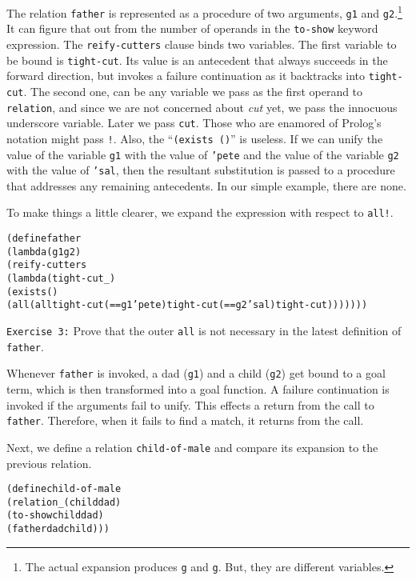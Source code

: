 The relation \texttt{father} is represented as a procedure of two
arguments, \texttt{g1} and \texttt{g2}.\footnote{The actual expansion
produces \texttt{g} and \texttt{g}.  But, they are different
variables.} It can figure that out from the number of operands in
the \texttt{to-show} keyword expression. The \texttt{reify-cutters}
clause binds two variables.  The first variable to be bound is
\texttt{tight-cut}.  Its value is an antecedent that always succeeds in the
forward direction, but invokes a failure continuation as it backtracks
into \texttt{tight-cut}.  The second one, can be any variable we pass as
the first operand to \texttt{relation}, and since we are not concerned
about \emph{cut} yet, we pass the innocuous underscore variable.
Later we pass \texttt{cut}.  Those who are enamored of Prolog's
notation might pass \texttt{!}.  Also, the ``\texttt{(exists ()}'' is
useless.  If we can unify the value of the variable \texttt{g1} with
the value of \texttt{'pete} and the value of the variable \texttt{g2}
with the value of \texttt{'sal}, then the resultant substitution is
passed to a procedure that addresses any remaining antecedents.  In
our simple example, there are none.

To make things a little clearer, we expand the expression with respect
to \texttt{all!}.

\begin{alltt}
(define father
  (lambda (g1 g2)
    (reify-cutters
      (lambda (tight-cut _)
        (exists ()
          (all (all tight-cut (== g1 'pete) tight-cut (== g2 'sal) tight-cut)))))))
\end{alltt}

\texttt{Exercise 3:} Prove that the outer \texttt{all} is not
necessary in the latest definition of \texttt{father}.

Whenever \texttt{father} is invoked, a dad (\texttt{g1}) and a child
(\texttt{g2}) get bound to a goal term, which is then transformed into
a goal function.  A failure continuation is invoked if the arguments
fail to unify.  This effects a return from the call to
\texttt{father}.  Therefore, when it fails to find a match, it returns
from the call.

Next, we define a relation \texttt{child-of-male} and compare its expansion
to the previous relation.

\begin{alltt}
(define child-of-male
  (relation _ (child dad)
    (to-show child dad)
    (father dad child)))
\end{alltt}

